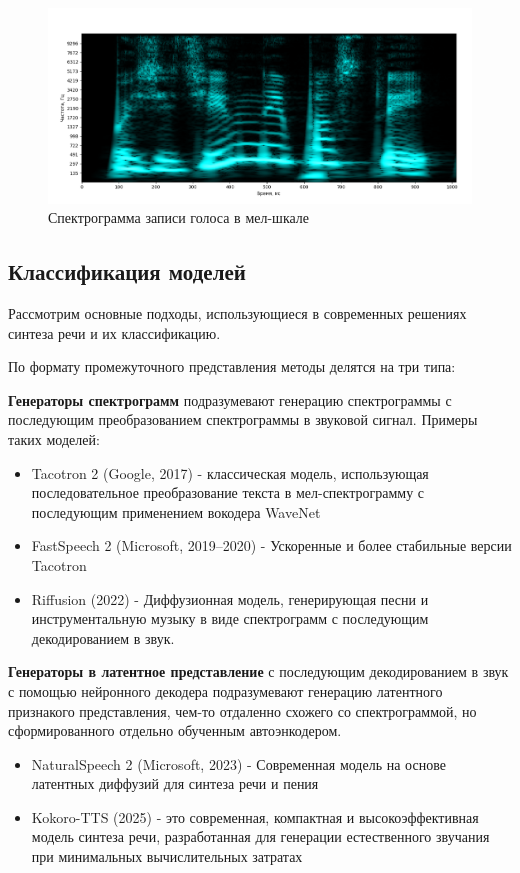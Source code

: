 \begin{figure}[t]
  \centering
  \includegraphics[width=16cm]{figures/mel_spec}
  \caption{Спектрограмма записи голоса в мел-шкале}
  \label{fig:mel_spec}
\end{figure}

\subsection{Классификация моделей}
Рассмотрим основные подходы, использующиеся в современных решениях синтеза речи и их классификацию.

По формату промежуточного представления методы делятся на три типа:

\textbf{Генераторы спектрограмм} подразумевают генерацию спектрограммы с последующим преобразованием спектрограммы в звуковой сигнал. Примеры таких моделей:
\begin{itemize}
  \item Tacotron 2 (Google, 2017) \cite{Tacotron2} - классическая модель, использующая последовательное преобразование текста в мел-спектрограмму с последующим применением вокодера WaveNet
  \item FastSpeech 2 (Microsoft, 2019–2020) \cite{FastSpeech2} - Ускоренные и более стабильные версии Tacotron
  \item Riffusion (2022) \cite{Riffusion} - Диффузионная модель, генерирующая песни и инструментальную музыку в виде спектрограмм с последующим декодированием в звук.
\end{itemize}

\textbf{Генераторы в латентное представление} с последующим декодированием в звук с помощью нейронного декодера подразумевают 
генерацию латентного признакого представления, чем-то отдаленно схожего со спектрограммой, но сформированного отдельно обученным автоэнкодером.

\begin{itemize} 
  \item NaturalSpeech 2 (Microsoft, 2023) \cite{NaturalSpeech2} - Современная модель на основе латентных диффузий для синтеза речи и пения
  \item Kokoro-TTS (2025) \cite{kokoro}- это современная, компактная и высокоэффективная модель синтеза речи, разработанная для генерации естественного звучания при минимальных вычислительных затратах
\end{itemize}

